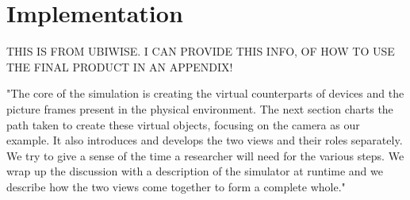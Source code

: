 \chapter{Implementation}\label{ch:implementation}

THIS IS FROM UBIWISE. I CAN PROVIDE THIS INFO, OF HOW TO USE THE FINAL PRODUCT IN AN APPENDIX!

"The core of the simulation is creating the virtual counterparts of devices and the
picture frames present in the physical environment. The next section charts the path
taken to create these virtual objects, focusing on the camera as our example. It also
introduces and develops the two views and their roles separately. We try to give a
sense of the time a researcher will need for the various steps. We wrap up the
discussion with a description of the simulator at runtime and we describe how the two
views come together to form a complete whole."